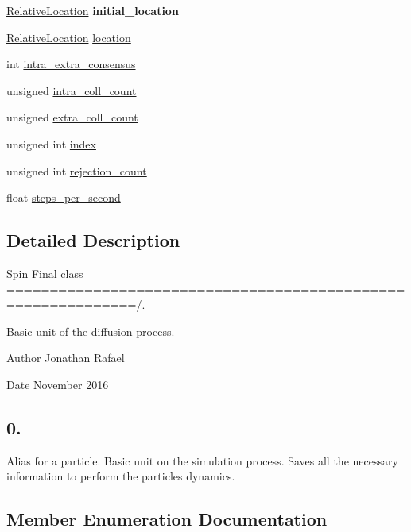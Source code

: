 \begin{DoxyCompactItemize}
\hyperlink{class_walker_a24246136a10754791b05cb570dbb8417}{Relative\+Location} {\bfseries initial\+\_\+location}
\item 
\hyperlink{class_walker_a24246136a10754791b05cb570dbb8417}{Relative\+Location} \hyperlink{class_walker_a77f5c801c38158bb8568f75a22baed20}{location}
\item 
int \hyperlink{class_walker_aa211ac1f9a396b1bf3b565e0f8ed098a}{intra\+\_\+extra\+\_\+consensus}
\item 
unsigned \hyperlink{class_walker_a8ca6c90f124e46869ea752920565e2c2}{intra\+\_\+coll\+\_\+count}
\item 
unsigned \hyperlink{class_walker_a28c595f6f6b4c32bed6afb177c0a6608}{extra\+\_\+coll\+\_\+count}
\item 
unsigned int \hyperlink{class_walker_a58e2d14d760748687138b7582cd04365}{index}
\item 
unsigned int \hyperlink{class_walker_a38669698192d39146c77011b69b1e372}{rejection\+\_\+count}
\item 
float \hyperlink{class_walker_a7f33d06b7aa5fabf2a2ac15d119bbcc7}{steps\+\_\+per\+\_\+second}
\end{DoxyCompactItemize}


\subsection{Detailed Description}
Spin Final class =============================================================/. 

Basic unit of the diffusion process.

\begin{DoxyAuthor}{Author}
Jonathan Rafael 
\end{DoxyAuthor}
\begin{DoxyDate}{Date}
November 2016 \subsection*{0. }
\end{DoxyDate}


Alias for a particle. Basic unit on the simulation process. Saves all the necessary information to perform the particles dynamics. 

\subsection{Member Enumeration Documentation}
\mbox{\label{class_walker_a24246136a10754791b05cb570dbb8417}} 
